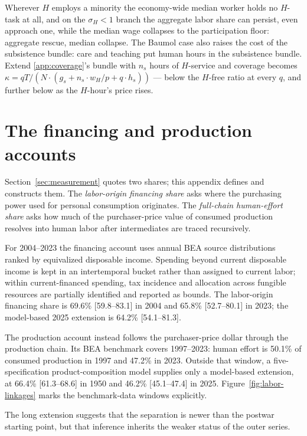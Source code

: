 \documentclass[12pt]{article}
\theoremstyle{plain}
\begin{document}
Wherever $H$ employs a minority the economy-wide median worker holds no $H$-task at all, and on the $\sigma _H < 1$ branch the aggregate labor share can persist, even approach one, while the median wage collapses to the participation floor: aggregate rescue, median collapse. The Baumol case also raises the cost of the subsistence bundle: care and teaching put human hours in the subsistence bundle. Extend \ref{app:coverage}'s bundle with $n_s$ hours of $H$-service and coverage becomes $\kappa = qT/(N\cdot (g_s + n_s\cdot w_H/p + q\cdot h_s))$ --- below the $H$-free ratio at every $q$, and further below as the $H$-hour's price rises.

\section{The financing and production accounts}\label{app:effort}

Section~\ref{sec:measurement} quotes two shares; this appendix defines and constructs them. The \emph{labor-origin financing share} asks where the purchasing power used for personal consumption originates. The \emph{full-chain human-effort share} asks how much of the purchaser-price value of consumed production resolves into human labor after intermediates are traced recursively.

For 2004--2023 the financing account uses annual BEA source distributions ranked by equivalized disposable income. Spending beyond current disposable income is kept in an intertemporal bucket rather than assigned to current labor; within current-financed spending, tax incidence and allocation across fungible resources are partially identified and reported as bounds. The labor-origin financing share is 69.6\% [59.8--83.1] in 2004 and 65.8\% [52.7--80.1] in 2023; the model-based 2025 extension is 64.2\% [54.1--81.3].

The production account instead follows the purchaser-price dollar through the production chain. Its BEA benchmark covers 1997--2023: human effort is 50.1\% of consumed production in 1997 and 47.2\% in 2023. Outside that window, a five-specification product-composition model supplies only a model-based extension, at 66.4\% [61.3--68.6] in 1950 and 46.2\% [45.1--47.4] in 2025. Figure~\ref{fig:labor-linkages} marks the benchmark-data windows explicitly.

The long extension suggests that the separation is newer than the postwar starting point, but that inference inherits the weaker status of the outer series.
\end{document}
